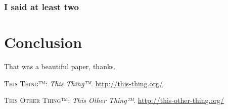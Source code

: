 \documentclass[DIV=calc, paper=a4, fontsize=11pt, twocolumn]{scrartcl}	 %
\begin{document}
\subsubsection{I said at least two}

\lipsum[1]

\section{Conclusion}

That was a beautiful paper, thanks.
\lipsum[1]


\begin{thebibliography}{99} %

\textsc{This Thing™}:
\newblock \emph{This Thing™}.
\newblock \url{http://this-thing.org/}

\textsc{This Other Thing™}:
\newblock \emph{This Other Thing™}.
\newblock \url{http://this-other-thing.org/}

\end{thebibliography}

\end{document}
